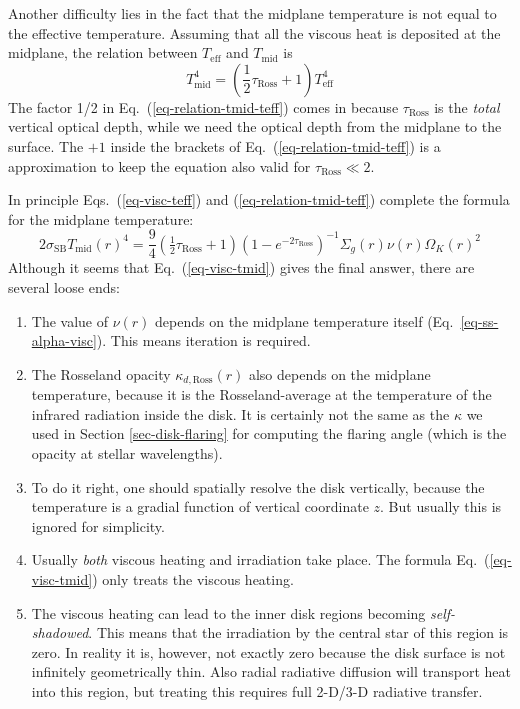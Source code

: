 \documentclass{book}
\begin{document}
Another difficulty lies in the fact that the midplane temperature is not equal
to the effective temperature. Assuming that all the viscous heat is
deposited at the midplane, the relation between $T_{\mathrm{eff}}$ and
$T_{\mathrm{mid}}$ is
\begin{equation}\label{eq-relation-tmid-teff}
T_{\mathrm{mid}}^4 = \left(\frac{1}{2}\tau_{\mathrm{Ross}}+1\right) T_{\mathrm{eff}}^4
\end{equation}
The factor 1/2 in
Eq.~(\ref{eq-relation-tmid-teff}) comes in because $\tau_{\mathrm{Ross}}$ is the
{\em total} vertical optical depth, while we need the optical depth from the
midplane to the surface. The $+1$ inside the brackets of
Eq.~(\ref{eq-relation-tmid-teff}) is a approximation to keep the equation also
valid for $\tau_{\mathrm{Ross}}\ll 2$.

In principle Eqs.~(\ref{eq-visc-teff}) and (\ref{eq-relation-tmid-teff})
complete the formula for the midplane temperature:
\begin{equation}\label{eq-visc-tmid}
  2\sigma_{\mathrm{SB}}T_{\mathrm{mid}}(r)^4 = \frac{9}{4}\left(\tfrac{1}{2}\tau_{\mathrm{Ross}}+1\right)
  \left(1-e^{-2\tau_{\mathrm{Ross}}}\right)^{-1}
  \Sigma_g(r)\nu(r)\Omega_K(r)^2
\end{equation}
Although it seems that Eq.~(\ref{eq-visc-tmid}) gives the final answer,
there are several loose ends:
\begin{enumerate}
\item\label{point-nudepend-iteration} The value of $\nu(r)$ depends on the midplane temperature itself
  (Eq.~\ref{eq-ss-alpha-visc}). This means iteration is required.
\item The Rosseland opacity $\kappa_{d,\mathrm{Ross}}(r)$ also depends on the
  midplane temperature, because it is the Rosseland-average at the temperature
  of the infrared radiation inside the disk. It is certainly not the same as the
  $\kappa$ we used in Section \ref{sec-disk-flaring} for computing the flaring
  angle (which is the opacity at stellar wavelengths).
\item To do it right, one should spatially resolve the disk vertically, because
  the temperature is a gradial function of vertical coordinate $z$. But usually
  this is ignored for simplicity.
\item\label{point-combine-visc-irr} Usually {\em both} viscous heating and irradiation take place. The
  formula Eq.~(\ref{eq-visc-tmid}) only treats the viscous heating.
\item The viscous heating can lead to the inner disk regions becoming
  {\em self-shadowed}. This means that the irradiation by the central
  star of this region is zero. In reality it is, however, not exactly
  zero because the disk surface is not infinitely geometrically thin.
  Also radial radiative diffusion will transport heat into this region,
  but treating this requires full 2-D/3-D radiative transfer.
\end{enumerate}
\end{document}
